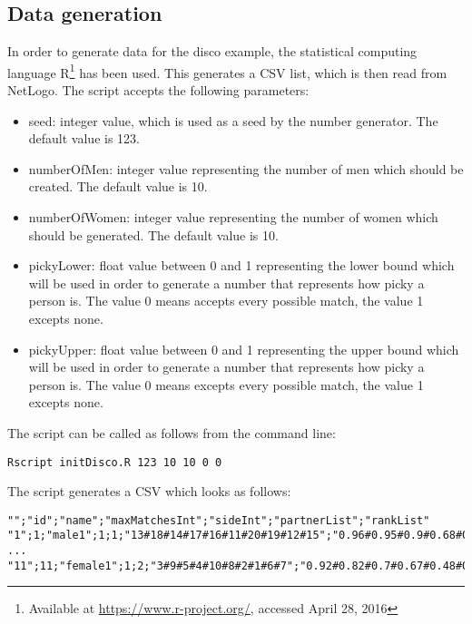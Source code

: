 \subsection{Data generation}
In order to generate data for the disco example, the statistical computing language R\footnote{Available at \url{https://www.r-project.org/}, accessed April 28, 2016} has been used. 
This generates a CSV list, which is then read from NetLogo. 
The script accepts the following parameters:
\begin{itemize}
	\item seed: integer value, which is used as a seed by the number generator. The default value is 123.
	\item numberOfMen: integer value representing the number of men which should be created. The default value is 10.
	\item numberOfWomen: integer value representing the number of women which should be generated. The default value is 10.
	\item pickyLower: float value between 0 and 1 representing the lower bound which will be used in order to generate a number that represents how picky a person is. The value 0 means accepts every possible match, the value 1 excepts none.
	\item pickyUpper: float value between 0 and 1 representing the upper bound which will be used in order to generate a number that represents how picky a person is. The value 0 means excepts every possible match, the value 1 excepts none.
\end{itemize}

The script can be called as follows from the command line: 
\begin{verbatim}
Rscript initDisco.R 123 10 10 0 0
\end{verbatim}

The script generates a CSV which looks as follows:
\begin{verbatim}
"";"id";"name";"maxMatchesInt";"sideInt";"partnerList";"rankList"
"1";1;"male1";1;1;"13#18#14#17#16#11#20#19#12#15";"0.96#0.95#0.9#0.68#0.57#0.45#0.33#0.25#0.1#0.04"
...
"11";11;"female1";1;2;"3#9#5#4#10#8#2#1#6#7";"0.92#0.82#0.7#0.67#0.48#0.41#0.35#0.25#0.22#0.05"
\end{verbatim}

